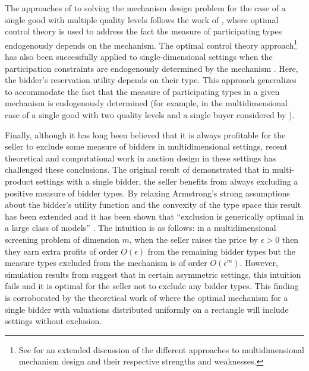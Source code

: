 The approaches of \autocite{pavlov2011optimal, thirumulanathan2019unitdemand} to solving the mechanism design problem for the case of a single good with multiple quality levels follows the work of \autocite{guesnerie1984complete}, where optimal control theory is used to address the fact the measure of participating types endogenously depends on the mechanism. The optimal control theory approach\footnote{See \autocite[\S 7]{basov2005multidimensional} for an extended discussion of the different approaches to multidimensional mechanism design and their respective strengths and weaknesses.} has also been successfully applied to single-dimensional settings when the participation constraints are endogenously determined by the mechanism \autocite{jullien2000}. Here, the bidder's reservation utility depends on their type. This approach generalizes to accommodate the fact that the measure of participating types in a given mechanism is endogenously determined (for example, in the multidimensional case of a single good with two quality levels and a single buyer considered by \cite{pavlov2011optimal,thirumulanathan2019unitdemand}).

Finally, although it has long been believed that it is always profitable for the seller to exclude some measure of bidders \autocite{rochet1998ironing,armstrong1996multiproduct} in multidimensional settings, recent theoretical and computational work in auction design in these settings has challenged these conclusions. The original result of \autocite{armstrong1996multiproduct} demonstrated that in multi-product settings with a single bidder, the seller benefits from always excluding a positive measure of bidder types. By relaxing Armstrong's strong assumptions about the bidder's utility function and the convexity of the type space this result has been extended and it has been shown that ``exclusion is generically optimal in a large class of models'' \autocite[75]{barelli2014exclusion}. The intuition is as follows: in a multidimensional screening problem of dimension $m$, when the seller raises the price by $\epsilon>0$ then they earn extra profits of order $O(\epsilon)$ from the remaining bidder types but the measure types excluded from the mechanism is of order $O(\epsilon^m)$. However, simulation results from \autocite{belloni2010multidimensional} suggest that in certain asymmetric settings, this intuition fails and it is optimal for the seller not to exclude any bidder types. This finding is corroborated by the theoretical work of \autocite{thirumulanathan2019unitdemand} where the optimal mechanism for a single bidder with valuations distributed uniformly on a rectangle will include settings without exclusion.

